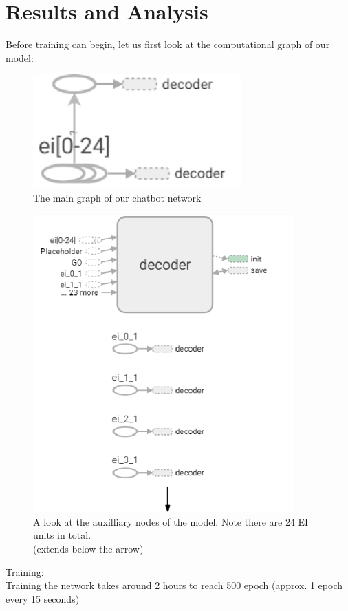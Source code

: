 \documentclass[titlepage]{article}
\newcommand\tab[1][1cm]{\hspace*{#1}}
\begin{document}
\section{Results and Analysis}
Before training can begin, let us first look at the computational graph of our model:
\begin{figure}[H]
	\centering
	\captionsetup{justification=centering}
	\includegraphics[width=80mm]{images/main_graph.png}
	\caption{The main graph of our chatbot network}
	\label{fig:maingraph}
\end{figure}
\begin{figure}[H]
	\centering
	\captionsetup{justification=centering}
	\includegraphics[width=100mm]{images/aux_nodes.png}
	\caption{A look at the auxilliary nodes of the model. Note there are 24 EI units in total.\\(extends below the arrow)}
	\label{fig:auxnodes}
\end{figure}
\newpage
\large{Training:}
\normalsize{\\ \tab Training the network takes around 2 hours to reach 500 epoch (approx. 1 epoch every 15 seconds)}
\end{document}

